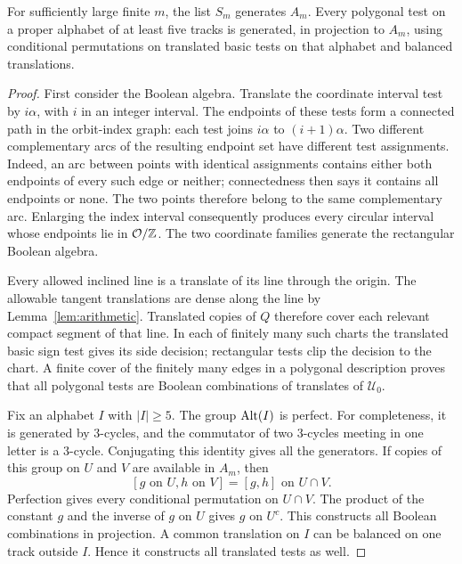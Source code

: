 \begin{lemma}\label{lem:lifting-generation}
For sufficiently large finite $m$, the list $S_m$ generates $A_m$.
Every polygonal test on a proper alphabet of at least five tracks
is generated, in projection to $A_m$, using conditional permutations
on translated basic tests on that alphabet and balanced translations.
\end{lemma}

\begin{proof}
First consider the Boolean algebra.  Translate the coordinate interval
test by $i\alpha$, with $i$ in an integer interval.  The endpoints of
these tests form a connected path in the orbit-index graph: each test
joins $i\alpha$ to $(i+1)\alpha$.  Two different complementary arcs
of the resulting endpoint set have different test assignments.  Indeed,
an arc between points with identical assignments contains either both
endpoints of every such edge or neither; connectedness then says it
contains all endpoints or none.  The two points therefore belong to
the same complementary arc.  Enlarging the index interval consequently
produces every circular interval whose endpoints lie in $\mathcal O/\mathbb Z$.
The two coordinate families generate the rectangular Boolean algebra.

Every allowed inclined line is a translate of its line through the
origin.  The allowable tangent translations are dense along the line
by Lemma~\ref{lem:arithmetic}.  Translated copies of $Q$ therefore
cover each relevant compact segment of that line.  In each of finitely
many such charts the translated basic sign test gives its side decision;
rectangular tests clip the decision to the chart.  A finite cover of
the finitely many edges in a polygonal description proves that all
polygonal tests are Boolean combinations of translates of
$\mathcal U_0$.

Fix an alphabet $I$ with $|I|\ge5$.  The group $\operatorname{Alt}(I)$ is perfect.
For completeness, it is generated by $3$-cycles, and the commutator of
two $3$-cycles meeting in one letter is a $3$-cycle.  Conjugating this
identity gives all the generators.  If copies of this group on $U$
and $V$ are available in $A_m$, then
\[
 [g\text{ on }U,h\text{ on }V]=[g,h]\text{ on }U\cap V.
\]
Perfection gives every conditional permutation on $U\cap V$.
The product of the constant $g$ and the inverse of $g$ on $U$ gives
$g$ on $U^c$.  This constructs all Boolean combinations in projection.
A common translation on $I$ can be balanced on one track outside $I$.
Hence it constructs all translated tests as well.


\end{proof}
